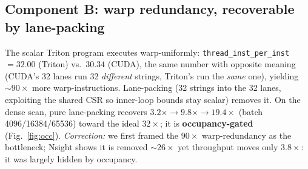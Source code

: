 \documentclass[manuscript,review,anonymous]{acmart}
\begin{document}
\subsection{Component B: warp redundancy, recoverable by lane-packing}
The scalar Triton program executes warp-uniformly: \texttt{thread\_inst\_per\_inst} $=32.00$ (Triton)
vs.\ $30.34$ (CUDA), the same number with opposite meaning (CUDA's 32 lanes run 32 \emph{different}
strings, Triton's run the \emph{same} one), yielding ${\sim}90\times$ more warp-instructions. Lane-packing
(32 strings into the 32 lanes, exploiting the shared CSR so inner-loop bounds stay scalar) removes it.
On the dense scan, pure lane-packing recovers $3.2\times \rightarrow 9.8\times \rightarrow 19.4\times$
(batch 4096/16384/65536) toward the ideal $32\times$; it is \textbf{occupancy-gated}
(Fig.~\ref{fig:occ}). \emph{Correction:} we first framed the $90\times$ warp-redundancy as the
bottleneck; Nsight shows it is removed ${\sim}26\times$ yet throughput moves only $3.8\times$: it was
largely hidden by occupancy.
\end{document}
